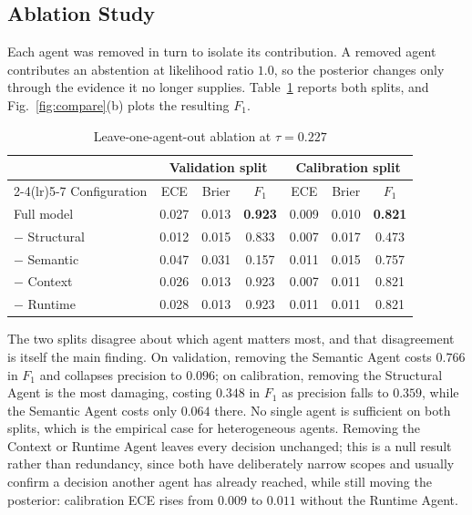 \documentclass[conference]{IEEEtran}
\begin{document}
\subsection{Ablation Study}
Each agent was removed in turn to isolate its contribution. A removed agent
contributes an abstention at likelihood ratio $1.0$, so the posterior
changes only through the evidence it no longer supplies.
Table~\ref{tab:ablation} reports both splits, and Fig.~\ref{fig:compare}(b)
plots the resulting $F_1$.

\begin{table}[t]
\centering
\caption{Leave-one-agent-out ablation at $\tau=0.227$}
\label{tab:ablation}
\small
\setlength{\tabcolsep}{3pt}
\begin{tabular}{lcccccc}
\toprule
 & \multicolumn{3}{c}{Validation split} & \multicolumn{3}{c}{Calibration split} \\
\cmidrule(lr){2-4}\cmidrule(lr){5-7}
Configuration & ECE & Brier & $F_1$ & ECE & Brier & $F_1$ \\
\midrule
Full model     & 0.027 & 0.013 & \textbf{0.923} & 0.009 & 0.010 & \textbf{0.821} \\
$-$ Structural & 0.012 & 0.015 & 0.833 & 0.007 & 0.017 & 0.473 \\
$-$ Semantic   & 0.047 & 0.031 & 0.157 & 0.011 & 0.015 & 0.757 \\
$-$ Context    & 0.026 & 0.013 & 0.923 & 0.007 & 0.011 & 0.821 \\
$-$ Runtime    & 0.028 & 0.013 & 0.923 & 0.011 & 0.011 & 0.821 \\
\bottomrule
\end{tabular}
\end{table}

The two splits disagree about which agent matters most, and that
disagreement is itself the main finding. On validation, removing the
Semantic Agent costs $0.766$ in $F_1$ and collapses precision to $0.096$;
on calibration, removing the Structural Agent is the most damaging, costing
$0.348$ in $F_1$ as precision falls to $0.359$, while the Semantic Agent
costs only $0.064$ there. No single agent is sufficient on both splits,
which is the empirical case for heterogeneous agents. Removing the Context
or Runtime Agent leaves every decision unchanged; this is a null result
rather than redundancy, since both have deliberately narrow scopes and
usually confirm a decision another agent has already reached, while still
moving the posterior: calibration ECE rises from $0.009$ to $0.011$ without
the Runtime Agent.
\end{document}
